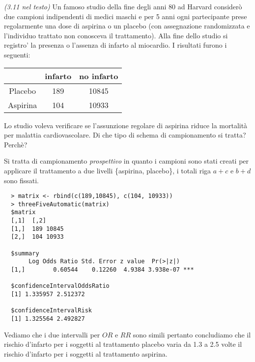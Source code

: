 \begin{exercise}{\emph{(3.11 nel testo)}}
  Un famoso studio della fine degli anni 80 ad Harvard consider\`o due
  campioni indipendenti di medici maschi e per 5 anni ogni
  partecipante prese regolarmente una dose di aspirina o un placebo
  (con assegnazione randomizzata e l'individuo trattato non conosceva
  il trattamento). Alla fine dello studio si registro' la presenza o
  l'assenza di infarto al miocardio. I risultati furono i seguenti:
  \begin{table}[h]              %
    \centering
    \begin{tabular}{|c|c|c|}
      \hline
       & infarto & no infarto \\\hline
      Placebo & 189 & 10845 \\
      Aspirina & 104 & 10933  \\ \hline
    \end{tabular}
  \end{table}
  Lo studio voleva verificare se l'assunzione regolare di aspirina
  riduce la mortalit\`a per malattia cardiovascolare. Di che tipo di
  schema di campionamento si tratta?  Perch\`e?
\end{exercise}

Si tratta di campionamento \emph{prospettivo} in quanto i campioni
sono stati creati per applicare il trattamento a due livelli
\{aspirina, placebo\}, i totali riga $a + c$ e $b + d$ sono fissati.
\begin{lstlisting}
  > matrix <- rbind(c(189,10845), c(104, 10933))
  > threeFiveAutomatic(matrix)
  $matrix
  [,1]  [,2]
  [1,]  189 10845
  [2,]  104 10933

  $summary
       Log Odds Ratio Std. Error z value  Pr(>|z|)    
  [1,]        0.60544    0.12260  4.9384 3.938e-07 ***

  $confidenceIntervalOddsRatio
  [1] 1.335957 2.512372

  $confidenceIntervalRisk
  [1] 1.325564 2.492827
\end{lstlisting}
Vediamo che i due intervalli per $OR$ e $RR$ sono simili pertanto
concludiamo che il rischio d'infarto per i soggetti al trattamento
placebo varia da 1.3 a 2.5 volte il rischio d'infarto per i soggetti
al trattamento aspirina.

